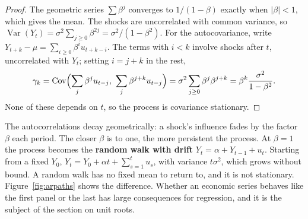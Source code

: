 \documentclass[11pt,a4paper]{article}
\numberwithin{equation}{section}
\DeclareMathOperator{\Var}{Var}
\DeclareMathOperator{\Cov}{Cov}
\theoremstyle{definition}
\begin{document}
\begin{proof}
The geometric series $\sum\beta^j$ converges to $1/(1 - \beta)$ exactly when $|\beta| < 1$, which gives the mean. The shocks are uncorrelated with
common variance, so $\Var(Y_t) = \sigma^2\sum_{j\geq0}\beta^{2j} = \sigma^2/(1 - \beta^2)$. For the autocovariance, write
$Y_{t+k} - \mu = \sum_{i\geq0}\beta^iu_{t+k-i}$. The terms with $i < k$ involve shocks after $t$, uncorrelated with $Y_t$; setting $i = j + k$ in the
rest,
\[
\gamma_k = \Cov\Bigl(\sum_j\beta^ju_{t-j},\ \sum_j\beta^{j+k}u_{t-j}\Bigr) = \sigma^2\sum_{j\geq0}\beta^j\beta^{j+k} = \beta^k\frac{\sigma^2}{1 - \beta^2} .
\]
None of these depends on $t$, so the process is covariance stationary.
\end{proof}

The autocorrelations decay geometrically: a shock's influence fades by the factor $\beta$ each period. The closer $\beta$ is to one, the more
persistent the process. At $\beta = 1$ the process becomes the \textbf{random walk with drift} $Y_t = \alpha + Y_{t-1} + u_t$. Starting from a
fixed $Y_0$, $Y_t = Y_0 + \alpha t + \sum_{s=1}^t u_s$, with variance $t\sigma^2$, which grows without bound. A random walk has no fixed mean to return
to, and it is not stationary. Figure~\ref{fig:arpaths} shows the difference. Whether an economic series behaves like the first panel or the last
has large consequences for regression, and it is the subject of the section on unit roots.
\end{document}

